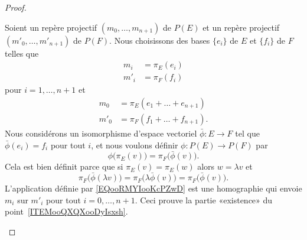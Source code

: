 \begin{proof}
\begin{subproof}
		Soient un repère projectif \( (m_0,\ldots, m_{n+1})\) de \( P(E)\) et un repère projectif \( (m'_0,\ldots, m'_{n+1})\) de \( P(F)\). Nous choisissons des bases \( \{ e_i \}\) de \( E\) et \(  \{ f_i \}\) de \( F\) telles que
		\begin{subequations}
			\begin{align}
				m_i  & =\pi_E(e_i) \\
				m'_i & =\pi_F(f_i)
			\end{align}
		\end{subequations}
		pour \( i=1,\ldots, n+1\) et
		\begin{subequations}
			\begin{align}
				m_0  & =\pi_E(e_1+\ldots +e_{n+1})  \\
				m'_0 & =\pi_F(f_1+\ldots +f_{n+1}).
			\end{align}
		\end{subequations}
		Nous considérons un isomorphisme d'espace vectoriel \( \bar\phi\colon E\to F\) tel que \( \bar\phi(e_i)=f_i\) pour tout \( i\), et nous voulons définir \( \phi\colon P(E)\to P(F)\) par
		\begin{equation}        \label{EQooRMYIooKcPZwD}
			\phi\big( \pi_E(v) \big)=\pi_F\big( \bar\phi(v) \big).
		\end{equation}
		Cela est bien définit parce que si \( \pi_E(v)=\pi_E(w)\) alors \( w=\lambda v\) et
		\begin{equation}
			\pi_F\big( \bar\phi(\lambda v) \big)=\pi_F\big( \lambda\bar\phi(v) \big)=\pi_F\big( \bar\phi(v) \big).
		\end{equation}
		L'application définie par \eqref{EQooRMYIooKcPZwD} est une homographie qui envoie \( m_i\) sur \( m'_i\) pour tout \( i=0,\ldots, n+1\). Ceci prouve la partie «existence» du point~\ref{ITEMooQXQXooDyIsxsh}.


\end{subproof}
\end{proof}
